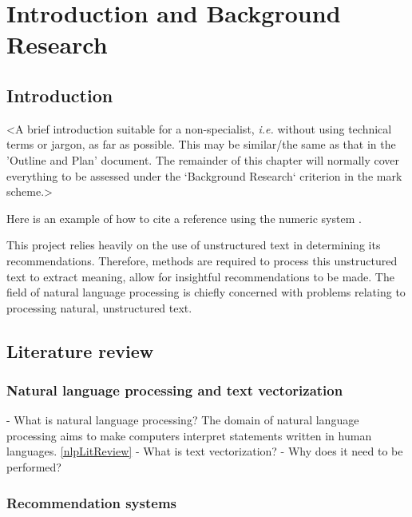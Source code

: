 \chapter{Introduction and Background Research}

\label{chapter1}

\section{Introduction}

<A brief introduction suitable for a non-specialist, {\em i.e.} without using technical terms or jargon, as far as possible. This may be similar/the same as that in the 'Outline and Plan' document. The remainder of this chapter will normally cover everything to be assessed under the `Background Research` criterion in the mark scheme.>

Here is an example of how to cite a reference using the numeric system \cite{parikh1980adaptive}.

This project relies heavily on the use of unstructured text in determining its recommendations. Therefore, methods are required to process this unstructured text to extract meaning, allow for insightful recommendations to be made. The field of natural language processing is chiefly concerned with problems relating to processing natural, unstructured text.


\section{Literature review}

\subsection{Natural language processing and text vectorization}
- What is natural language processing?
The domain of natural language processing aims to make computers interpret statements written in human languages. \ref{nlpLitReview}
- What is text vectorization?
- Why does it need to be performed?    

\subsection{Recommendation systems}